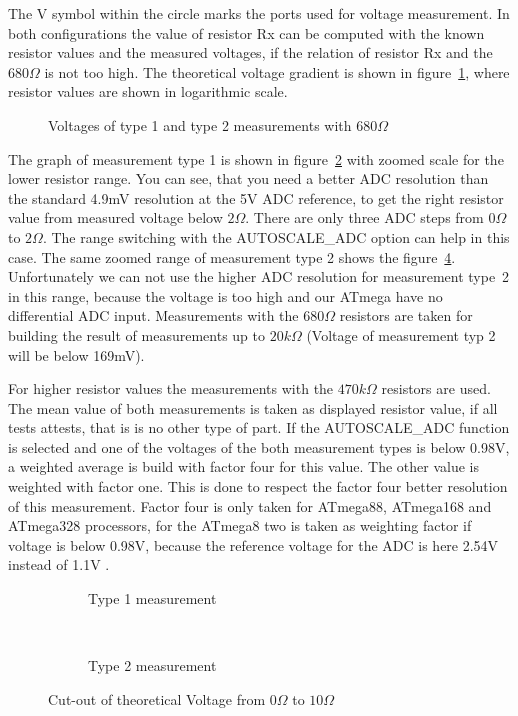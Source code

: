 The V symbol within the circle marks the ports used for voltage measurement.
In both configurations the value of resistor Rx can be computed with the known
resistor values and the measured voltages, if the relation of resistor Rx and the \(680\Omega\) is not too high.
The theoretical voltage gradient is shown in figure~\ref{fig:RLvtot}, where resistor values are shown in logarithmic scale.
\begin{figure}[H]
\centering

\caption{Voltages of type 1 and type 2 measurements with \(680\Omega\) }
\label{fig:RLvtot}
\end{figure}
The graph of measurement type 1 is shown in figure~\ref{fig:RLvlow} with zoomed scale for the lower resistor range.
You can see, that you need a better ADC resolution than the standard 4.9mV resolution at the 5V ADC reference, to get
the right resistor value from measured voltage below \(2\Omega\).
There are only three ADC steps from \(0\Omega\) to \(2\Omega\).
The range switching with the AUTOSCALE\_ADC option can help in this case.
The same zoomed range of measurement type 2 shows the figure~\ref{fig:RLvhigh}.
Unfortunately we can not use the higher ADC resolution for measurement type~2 in this range,
 because the voltage is too high and our ATmega have no differential ADC input.
Measurements with the \(680\Omega\) resistors are taken for building the result of measurements up to \(20k\Omega\)
(Voltage of measurement typ 2 will be below 169mV).

For higher resistor values the measurements with the \(470k\Omega\) resistors are used. The mean value of both
measurements is taken as displayed resistor value, if all tests attests, that is is no other type of part.
If the AUTOSCALE\_ADC function is selected and one of the voltages of the both measurement types is below 0.98V,
a weighted average is build with factor four for this value. The other value is weighted with factor one.
This is done to respect the factor four better resolution of this measurement. Factor four is only taken for ATmega88,
ATmega168 and ATmega328 processors, for the ATmega8 two is taken as weighting factor if voltage is below 0.98V,
because the reference voltage for the ADC is here 2.54V instead of 1.1V .

\begin{figure}[H]
  \begin{subfigure}[b]{9cm}
    \centering
    \resizebox{9cm}{!}{}
    \caption{Type 1 measurement}
    \label{fig:RLvlow}
  \end{subfigure}
  ~
  \begin{subfigure}[b]{9cm}
    \centering
    \resizebox{9cm}{!}{}
    \caption{Type 2 measurement}
    \label{fig:RLvhigh}
  \end{subfigure}
  \caption{Cut-out of theoretical Voltage from \(0\Omega\) to \(10\Omega\)}
\end{figure}


